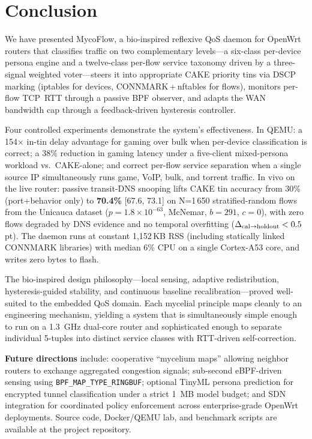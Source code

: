 \documentclass[conference]{IEEEtran}
\begin{document}
\section{Conclusion}
\label{sec:conclusion}

We have presented MycoFlow, a bio-inspired reflexive QoS daemon for OpenWrt
routers that classifies traffic on two complementary levels---a six-class
per-device persona engine and a twelve-class per-flow service taxonomy
driven by a three-signal weighted voter---steers it into appropriate CAKE
priority tins via DSCP marking (iptables for devices, CONNMARK\,+\,nftables
for flows), monitors per-flow TCP~RTT through a passive BPF observer, and
adapts the WAN bandwidth cap through a feedback-driven hysteresis
controller.

Four controlled experiments demonstrate the system's effectiveness.
In QEMU: a 154$\times$ in-tin delay advantage for gaming over bulk when
per-device classification is correct; a 38\% reduction in gaming latency
under a five-client mixed-persona workload vs.\ CAKE-alone; and correct
per-flow service separation when a single source IP simultaneously runs
game, VoIP, bulk, and torrent traffic.
In vivo on the live router: passive transit-DNS snooping lifts CAKE tin
accuracy from 30\% (port+behavior only) to \textbf{70.4\%} [67.6, 73.1]
on N=1\,650 stratified-random flows from the Unicauca dataset
($p=1.8{\times}10^{-63}$, McNemar, $b=291$, $c=0$), with zero flows
degraded by DNS evidence and no temporal overfitting
($\Delta_{\rm cal\to holdout}<0.5$\,pt).
The daemon runs at constant 1{,}152\,KB RSS (including statically linked
CONNMARK libraries) with median 6\% CPU on a single Cortex-A53 core,
and writes zero bytes to flash.

The bio-inspired design philosophy---local sensing, adaptive redistribution,
hysteresis-guided stability, and continuous baseline recalibration---proved
well-suited to the embedded QoS domain.
Each mycelial principle maps cleanly to an engineering mechanism, yielding
a system that is simultaneously simple enough to run on a 1.3~GHz
dual-core router and sophisticated enough to separate
individual 5-tuples into distinct service classes with RTT-driven
self-correction.

\textbf{Future directions} include:
cooperative ``mycelium maps'' allowing neighbor routers to exchange
aggregated congestion signals;
sub-second eBPF-driven sensing using \texttt{BPF\_MAP\_TYPE\_RINGBUF};
optional TinyML persona prediction for encrypted tunnel classification
under a strict 1~MB model budget;
and SDN integration for coordinated policy enforcement across
enterprise-grade OpenWrt deployments.
Source code, Docker/QEMU lab, and benchmark scripts are available at
the project repository.
\end{document}
